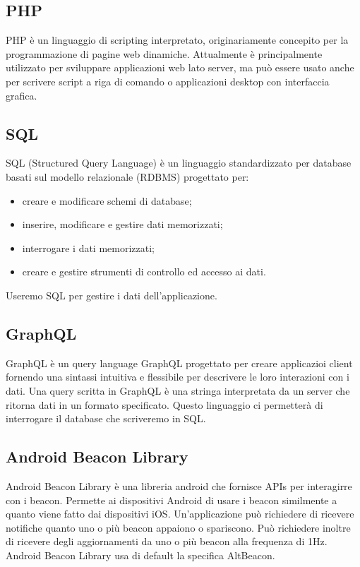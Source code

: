 		

\subsection{PHP}
	PHP è un linguaggio di scripting interpretato, originariamente concepito per la programmazione di pagine web dinamiche. 
	Attualmente è principalmente utilizzato per sviluppare applicazioni web lato server, ma può essere usato anche per scrivere script a riga di comando o applicazioni desktop con interfaccia grafica.
	
\subsection{SQL}
	SQL (Structured Query Language) è un linguaggio standardizzato per database basati sul modello relazionale (RDBMS) progettato per:
	\begin{itemize}
		\item 	creare e modificare schemi di database;
		\item 	inserire, modificare e gestire dati memorizzati;
		\item 	interrogare i dati memorizzati;
		\item 	creare e gestire strumenti di controllo ed accesso ai dati.
	\end{itemize}
	Useremo SQL per gestire i dati dell'applicazione.
	
\subsection{GraphQL} 
	GraphQL è un query language GraphQL progettato per creare applicazioi client fornendo una sintassi intuitiva e flessibile per descrivere le loro interazioni con i dati. 
	Una query scritta in GraphQL è una stringa interpretata da un server che ritorna dati in un formato specificato. 
	Questo linguaggio ci permetterà di interrogare il database che scriveremo in SQL.

\subsection{Android Beacon Library}
	Android Beacon Library è una libreria android che fornisce APIs per interagirre con i beacon. Permette ai dispositivi Android di usare i beacon similmente a quanto viene fatto dai dispositivi iOS. Un'applicazione può richiedere di ricevere notifiche quanto uno o più beacon appaiono o spariscono. Può richiedere inoltre di ricevere degli aggiornamenti da uno o più beacon alla frequenza di 1Hz.
	Android Beacon Library usa di default la specifica AltBeacon.
	
